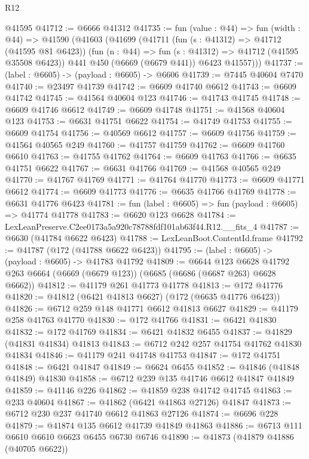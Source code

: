 \begin{lexlean}{R12}
\begin{coremodule}
    @41595
@41712 := @6666 @41312
@41735 := fun (value : @44) =>
  fun (width : @44) =>
  @41590
    (@41603
      (@41699
        (@41711
          (fun (s : @41312) => @41712 (@41595 @81 @6423))
          (fun (n : @44) => fun (s : @41312) => @41712 (@41595 @35508 @6423))
          @441
          @450
          (@6669 (@6679 @441))
          @6423
          @41557)))
@41737 := (label : @6605) -> (payload : @6605) -> @6606
@41739 := @7445 @40604 @7470
@41740 := @23497 @41739
@41742 := @6609 @41740 @6612
@41743 := @6609 @41742
@41745 := @41564 @40604 @123
@41746 := @41743 @41745
@41748 := @6609 @41746 @6612
@41749 := @6609 @41748
@41751 := @41568 @40604 @123
@41753 := @6631 @41751 @6622
@41754 := @41749 @41753
@41755 := @6609 @41754
@41756 := @40569 @6612
@41757 := @6609 @41756
@41759 := @41564 @40565 @249
@41760 := @41757 @41759
@41762 := @6609 @41760 @6610
@41763 := @41755 @41762
@41764 := @6609 @41763
@41766 := @6635 @41751 @6622
@41767 := @6631 @41766
@41769 := @41568 @40565 @249
@41770 := @41767 @41769
@41771 := @41764 @41770
@41773 := @6609 @41771 @6612
@41774 := @6609 @41773
@41776 := @6635 @41766 @41769
@41778 := @6631 @41776 @6423
@41781 := fun (label : @6605) => fun (payload : @6605) => @41774 @41778
@41783 := @6620 @123 @6628
@41784 := LexLeanPreserve.C2ee0173a5a920c78788fdf101ab63f44.R12.__fits_4
@41787 := @6630 (@41784 @6622 @6423)
@41788 := LexLeanBoot.ContentId.frame
@41792 := @41787 (@172 (@41788 @6622 @6423))
@41795 := (label : @6605) -> (payload : @6605) -> @41783 @41792
@41809 := @6644
    @123
    @6628
    @41792
    @263
    @6664
    (@6669 (@6679 @123))
    (@6685 (@6686 (@6687 @263) @6628 @6662))
@41812 := @41179 @261 @41773 @41778
@41813 := @172 @41776
@41820 := @41812 (@6421 @41813 @6627) (@172 (@6635 @41776 @6423))
@41826 := @6712 @259 @148 @41771 @6612 @41813 @6627
@41829 := @41179 @258 @41763 @41770
@41830 := @172 @41766
@41831 := @6421 @41830
@41832 := @172 @41769
@41834 := @6421 @41832 @6455
@41837 := @41829 (@41831 @41834) @41813
@41843 := @6712 @242 @257 @41754 @41762 @41830 @41834
@41846 := @41179 @241 @41748 @41753
@41847 := @172 @41751
@41848 := @6421 @41847
@41849 := @6624 @6455
@41852 := @41846 (@41848 @41849) @41830
@41858 := @6712 @239 @135 @41746 @6612 @41847 @41849
@41859 := @41146 @226
@41862 := @41859 @238 @41742 @41745
@41863 := @233 @40604
@41867 := @41862 (@6421 @41863 @27126) @41847
@41873 := @6712 @230 @237 @41740 @6612 @41863 @27126
@41874 := @6696 @228
@41879 := @41874 @135 @6612 @41739 @41849 @41863
@41886 := @6713 @111 @6610 @6610 @6623 @6455 @6730 @6746
@41890 := @41873 (@41879 @41886 (@40705 @6622))

\end{coremodule}
\end{lexlean}

